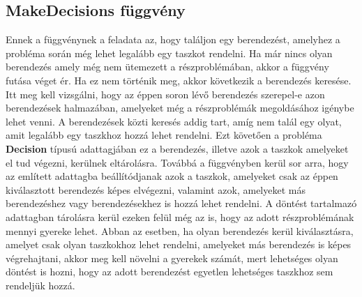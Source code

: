 \subsection{MakeDecisions függvény}
Ennek a függvénynek a feladata az, hogy találjon egy berendezést, amelyhez a probléma során még lehet legalább egy taszkot rendelni. Ha már nincs olyan berendezés amely még nem ütemezett a részproblémában, akkor a függvény futása véget ér.
Ha ez nem történik meg, akkor következik a berendezés keresése.
Itt meg kell vizsgálni, hogy az éppen soron lévő berendezés szerepel-e azon berendezések halmazában, amelyeket még a részproblémák megoldásához igénybe lehet venni.
A berendezések közti keresés addig tart, amíg nem talál egy olyat, amit legalább egy taszkhoz hozzá lehet rendelni.
Ezt követően a probléma \textbf{Decision} típusú adattagjában ez a berendezés, illetve azok a taszkok amelyeket el tud végezni, kerülnek eltárolásra.
Továbbá a függvényben kerül sor arra, hogy az említett adattagba beállítódjanak azok a taszkok, amelyeket csak az éppen kiválasztott berendezés képes elvégezni, valamint azok, amelyeket más berendezéshez vagy berendezésekhez is hozzá lehet rendelni.
A döntést tartalmazó adattagban tárolásra kerül ezeken felül még az is, hogy az adott részproblémának mennyi gyereke lehet.
Abban az esetben, ha olyan berendezés kerül kiválasztásra, amelyet csak olyan taszkokhoz lehet rendelni, amelyeket más berendezés is képes végrehajtani, akkor meg kell növelni a gyerekek számát, mert lehetséges olyan döntést is hozni, hogy az adott berendezést egyetlen lehetséges taszkhoz sem rendeljük hozzá.
 
